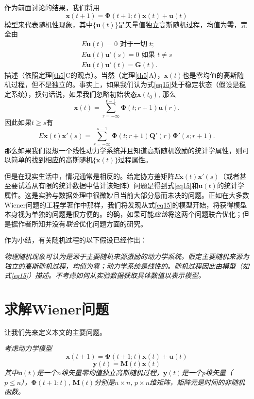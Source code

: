 \documentclass[UTF8,adobefonts]{ctexart}
\newcommand{\boldPhi}{\boldsymbol{\Phi}}
\begin{document}
作为前面讨论的结果，我们将用
\begin{equation}
\label{eq15}
\mathbf{x}(t+1)=\boldPhi(t+1;t)\mathbf{x}(t)+\mathbf{u}(t)
\end{equation}
模型来代表随机性现象，其中$\{\mathbf{u}(t)\}$是矢量值独立高斯随机过程，均值为零，完全由
\begin{align*}
E\mathbf{u}(t)=0 \text{ 对于一切 } t;\\
E\mathbf{u}(t)\mathbf{u'}(s)=0 \text{ 如果 } t \ne s\\
E\mathbf{u}(t)\mathbf{u'}(t)=\mathbf{G}(t).
\end{align*}
描述（依照定理\ref{th5}C的观点）。当然（定理\ref{th5}A），$\mathbf{x}(t)$也是零均值的高斯随机过程，但不是独立的。事实上，如果我们认为式\ref{eq15}处于稳定状态（假设是稳定系统），换句话说，如果我们忽略初始状态$\mathbf{x}(t_0)$, 那么
\begin{equation*}
\mathbf{x}(t)=\sum^{t-1}_{r=-\infty}\boldPhi(t;r+1)\mathbf{u}(r).
\end{equation*}
因此如果$t \ge s$有
\begin{equation*}
E\mathbf{x}(t)\mathbf{x'}(s)=\sum^{s-1}_{r=-\infty}\boldPhi(t;r+1)\mathbf{Q'}(r)\boldsymbol{\Phi'}(s;r+1).
\end{equation*}
那么如果我们设想一个线性动力学系统并且知道高斯随机激励的统计学属性，则可以简单的找到相应的高斯随机$\{\mathbf{x}(t)\}$过程属性。

但是在现实生活中，情况通常是相反的。给定协方差矩阵$E\mathbf{x}(t)\mathbf{x'}(s)$（或者甚至要试着从有限的统计数据中估计该矩阵）问题是得到式\ref{eq15}和$\mathbf{u}(t)$的统计学属性。这是实验与数据处理中很微妙且当前大部分悬而未决的问题。正如在大多数Wiener问题的工程学著作中那样，我们将发现从式\ref{eq15}的模型开始，将获得模型本身视为单独的问题是很方便的。的确，如果可能\emph{应该}将这两个问题联合优化；但是据作者所知并没有\emph{联合}优化问题方面的研究。

作为小结，有关随机过程的以下假设已经作出：

\emph{物理随机现象可认为是源于主要随机来源激励的动力学系统。假定主要随机来源为独立的高斯随机过程，均值为零；动力学系统是线性的。随机过程因此由模型（如式\ref{eq15}）描述。不考虑如何从实验数据获取具体数值以表示模型。}

\section{求解Wiener问题}
让我们先来定义本文的主要问题。

{}\emph{考虑动力学模型}
\begin{equation}
\label{eq16}
\mathbf{x}(t+1)=\boldsymbol{\Phi}(t+1;t)\mathbf{x}(t)+\mathbf{u}(t)
\end{equation}
\begin{equation}
\label{eq17}
\mathbf{y}(t)=\mathbf{M}(t)\mathbf{x}(t)
\end{equation}
\emph{其中}$\mathbf{u}(t)$\emph{是一个}$n$\emph{维矢量零均值独立高斯随机过程，}$\mathbf{y}(t)$\emph{是一个}$p$\emph{维矢量（}$p \le n$\emph{），}$\boldsymbol{\Phi}(t+1;t)\text{, }\mathbf{M}(t)$\emph{分别是}$n \times n\text{, }p \times n$\emph{维矩阵，矩阵元是时间的非随机函数。}
\end{document}
